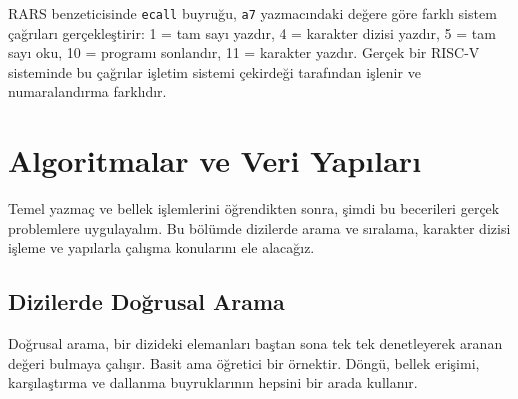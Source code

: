 \begin{bilginot}
RARS benzeticisinde \texttt{ecall} buyruğu, \texttt{a7} yazmacındaki değere göre farklı sistem çağrıları gerçekleştirir: 1 = tam sayı yazdır, 4 = karakter dizisi yazdır, 5 = tam sayı oku, 10 = programı sonlandır, 11 = karakter yazdır. Gerçek bir RISC-V sisteminde bu çağrılar işletim sistemi çekirdeği tarafından işlenir ve numaralandırma farklıdır.
\end{bilginot}


\section{Algoritmalar ve Veri Yapıları}
\label{sec:algoritmalar}

Temel yazmaç ve bellek işlemlerini öğrendikten sonra, şimdi bu becerileri gerçek problemlere uygulayalım. Bu bölümde dizilerde arama ve sıralama, karakter dizisi işleme ve yapılarla çalışma konularını ele alacağız.

\subsection{Dizilerde Doğrusal Arama}
\label{subsec:dogrusal-arama}

Doğrusal arama, bir dizideki elemanları baştan sona tek tek denetleyerek aranan değeri bulmaya çalışır. Basit ama öğretici bir örnektir. Döngü, bellek erişimi, karşılaştırma ve dallanma buyruklarının hepsini bir arada kullanır.

